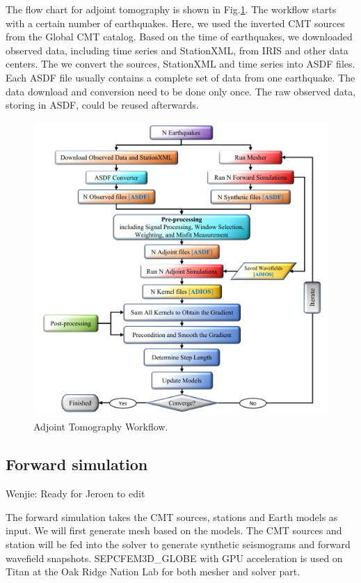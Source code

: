 \documentclass[extra,mreferee]{gji}
\begin{document}
The flow chart for adjoint tomography is shown in Fig.\ref{fig:adjoint_workflow}.
The workflow starts with a certain number of earthquakes. Here, we used the
inverted CMT sources from the Global CMT catalog. Based on the time
of earthquakes, we downloaded observed data, including time series and StationXML,
from IRIS and other data centers. The we convert the sources, StationXML and time series
into ASDF files. Each ASDF file usually contains a complete set of data from one
earthquake. The data download and conversion need to be done only once. The raw observed data,
storing in ASDF, could be reused afterwards.

\begin{figure}
  \centering
  \includegraphics[width=\textwidth]{figures/adjoint_workflow_6.pdf}
  \caption{Adjoint Tomography Workflow.}
  \label{fig:adjoint_workflow}
\end{figure}

\subsection{Forward simulation}

{\color{Red} Wenjie: Ready for Jeroen to edit}

The forward simulation takes the CMT sources, stations and Earth models as input.
We will first generate mesh based on the models. The CMT sources and station will
be fed into the solver to generate synthetic seismograms and forward wavefield snapshots.
SEPCFEM3D\_GLOBE with GPU acceleration is used on Titan at the Oak Ridge Nation Lab for
both mesher and solver part.
\end{document}
